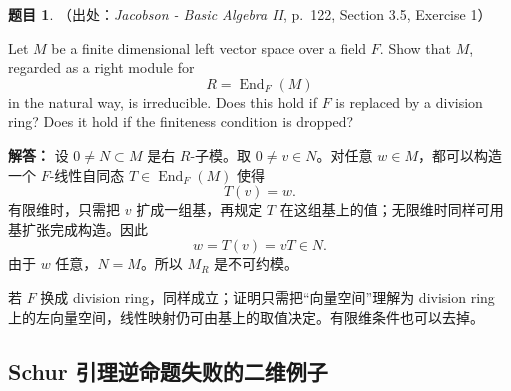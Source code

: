\documentclass[a4paper]{ctexart}
\theoremstyle{definition}
\newtheorem{example}{题目}[section]
\theoremstyle{analysis}
\theoremstyle{plain}
\begin{document}
\begin{example}
（出处：\textit{Jacobson - Basic Algebra II}, p.~122, Section 3.5, Exercise 1）

Let \(M\) be a finite dimensional left vector space over a field \(F\). Show that
\(M\), regarded as a right module for
\[
  R=\operatorname{End}_F(M)
\]
in the natural way, is irreducible. Does this hold if \(F\) is replaced by a
division ring? Does it hold if the finiteness condition is dropped?

\textbf{解答：}
设 \(0\ne N\subset M\) 是右 \(R\)-子模。取 \(0\ne v\in N\)。对任意 \(w\in M\)，都可以构造一个
\(F\)-线性自同态 \(T\in \operatorname{End}_F(M)\) 使得
\[
  T(v)=w.
\]
有限维时，只需把 \(v\) 扩成一组基，再规定 \(T\) 在这组基上的值；无限维时同样可用基扩张完成构造。因此
\[
  w=T(v)=vT\in N.
\]
由于 \(w\) 任意，\(N=M\)。所以 \(M_R\) 是不可约模。

若 \(F\) 换成 division ring，同样成立；证明只需把“向量空间”理解为 division ring 上的左向量空间，线性映射仍可由基上的取值决定。有限维条件也可以去掉。
\end{example}

\subsection{Schur 引理逆命题失败的二维例子}
\label{subsec:problem-schur-converse-counterexample}
\end{document}
